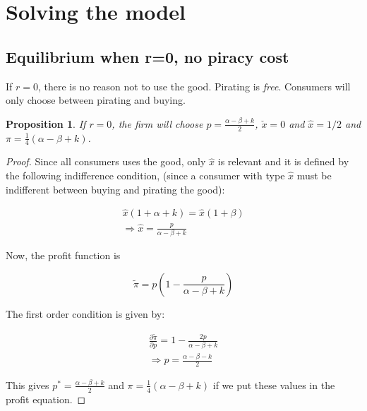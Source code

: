 \documentclass[12pt]{article}
\newtheorem{proposition}{Proposition}
\numberwithin{equation}{section}
\begin{document}
\section{Solving the model}


\subsection{Equilibrium when r=0, no piracy cost}

If $r=0$, there is no reason not to use the good. Pirating is \textit{free}. Consumers will only choose between pirating and buying. 

\begin{proposition}
If $r=0$, the firm will choose $p=\frac{\alpha-\beta+k}{2}$, $\check{x}=0$ and $\hat{x}=1/2$ and $\pi= \frac{1}{4}(\alpha-\beta+k)$.
\end{proposition}

\begin{proof}

Since all consumers uses the good, only $\hat{x}$ is relevant and it is defined by the following indifference condition, (since a consumer with type $\hat{x}$ must be indifferent between buying and pirating the good):

\begin{align*}
\hat{x}(1+\alpha+k)=\hat{x}(1+\beta) \\
\Rightarrow \hat{x} = \frac{p}{\alpha - \beta +k}
\end{align*}


Now, the profit function is

\begin{equation*}
\tilde{\pi} = p\left(1-\frac{p}{\alpha - \beta +k}\right)
\end{equation*}

The first order condition is given by:

\begin{align*}
\frac{\partial \tilde{\pi}}{\partial p}= 1-\frac{2p}{\alpha - \beta +k}\\
\Rightarrow p = \frac{\alpha-\beta-k}{2}
\end{align*} 

This gives  $p^*=\frac{\alpha-\beta+k}{2}$ and $\pi=\frac{1}{4}(\alpha-\beta+k)$ if we put these values in the profit equation. 

\end{proof}
\end{document}
